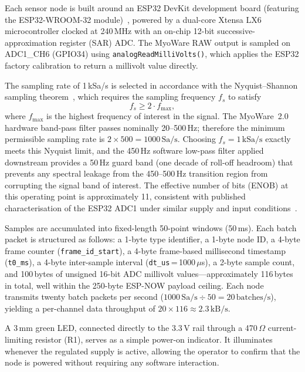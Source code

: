 Each sensor node is built around an ESP32 DevKit development board (featuring the ESP32-WROOM-32 module)~\cite{espressif_esp32}, powered by a dual-core Xtensa LX6 microcontroller clocked at 240\,MHz with an on-chip 12-bit successive-approximation register (SAR) ADC. The MyoWare RAW output is sampled on ADC1\_CH6 (GPIO34) using \texttt{analogReadMilliVolts()}, which applies the ESP32 factory calibration to return a millivolt value directly.

The sampling rate of 1\,kSa/s is selected in accordance with the Nyquist--Shannon sampling theorem~\cite{shannon1949communication}, which requires the sampling frequency $f_s$ to satisfy
\begin{equation}
  f_s \geq 2 \cdot f_{\max},
\end{equation}
where $f_{\max}$ is the highest frequency of interest in the signal. The MyoWare~2.0 hardware band-pass filter passes nominally 20--500\,Hz; therefore the minimum permissible sampling rate is $2 \times 500 = 1000\,\text{Sa/s}$. Choosing $f_s = 1\,\text{kSa/s}$ exactly meets this Nyquist limit, and the 450\,Hz software low-pass filter applied downstream provides a 50\,Hz guard band (one decade of roll-off headroom) that prevents any spectral leakage from the 450--500\,Hz transition region from corrupting the signal band of interest. The effective number of bits (ENOB) at this operating point is approximately 11, consistent with published characterisation of the ESP32 ADC1 under similar supply and input conditions~\cite{gomez2022wearable}.

Samples are accumulated into fixed-length 50-point windows (50\,ms). Each batch packet is structured as follows: a 1-byte type identifier, a 1-byte node ID, a 4-byte frame counter (\texttt{frame\_id\_start}), a 4-byte frame-based millisecond timestamp (\texttt{t0\_ms}), a 4-byte inter-sample interval (\texttt{dt\_us}\,=\,1000\,$\mu$s), a 2-byte sample count, and 100\,bytes of unsigned 16-bit ADC millivolt values---approximately 116\,bytes in total, well within the 250-byte ESP-NOW payload ceiling. Each node transmits twenty batch packets per second ($1000\,\text{Sa/s} \div 50 = 20\,\text{batches/s}$), yielding a per-channel data throughput of $20 \times 116 \approx 2.3\,\text{kB/s}$.

A 3\,mm green LED, connected directly to the 3.3\,V rail through a 470\,$\Omega$ current-limiting resistor (R1), serves as a simple power-on indicator. It illuminates whenever the regulated supply is active, allowing the operator to confirm that the node is powered without requiring any software interaction.

